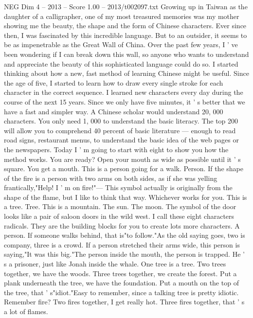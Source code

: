 \begin{textsample}{NEG Dim 4 – 2013 – Score 1.00 – 2013/t002097.txt}  \label{ex:f4_neg_007}
Growing up in Taiwan as the daughter of a calligrapher, one of my most treasured memories was my mother showing me the beauty, the shape and the form of Chinese characters.
Ever since then, I was fascinated by this incredible language.
But to an outsider, it seems to be as impenetrable as the Great Wall of China.
Over the past few years, I ' ve been wondering if I can break down this wall, so anyone who wants to understand and appreciate the beauty of this sophisticated language could do so.
I started thinking about how a new, fast method of learning Chinese might be useful.
Since the age of five, I started to learn how to draw every single stroke for each character in the correct sequence.
I learned new characters every day during the course of the next 15 years.
Since we only have five minutes, it ' s better that we have a fast and simpler way.
A Chinese scholar would understand 20, 000 characters.
You only need 1, 000 to understand the basic literacy.
The top 200 will allow you to comprehend 40 percent of basic literature — enough to read road signs, restaurant menus, to understand the basic idea of the web pages or the newspapers.
Today I ' m going to start with eight to show you how the method works.
You are ready?
Open your mouth as wide as possible until it ' s square.
You get a mouth.
This is a person going for a walk.
Person.
If the shape of the fire is a person with two arms on both sides, as if she was yelling frantically,"Help!
I ' m on fire!"— This symbol actually is originally from the shape of the flame, but I like to think that way.
Whichever works for you.
This is a tree.
Tree.
This is a mountain.
The sun.
The moon.
The symbol of the door looks like a pair of saloon doors in the wild west.
I call these eight characters radicals.
They are the building blocks for you to create lots more characters.
A person.
If someone walks behind, that is"to follow."As the old saying goes, two is company, three is a crowd.
If a person stretched their arms wide, this person is saying,"It was this big."The person inside the mouth, the person is trapped.
He ' s a prisoner, just like Jonah inside the whale.
One tree is a tree.
Two trees together, we have the woods.
Three trees together, we create the forest.
Put a plank underneath the tree, we have the foundation.
Put a mouth on the top of the tree, that ' s"idiot."Easy to remember, since a talking tree is pretty idiotic.
Remember fire?
Two fires together, I get really hot.
Three fires together, that ' s a lot of flames.

\end{textsample}
